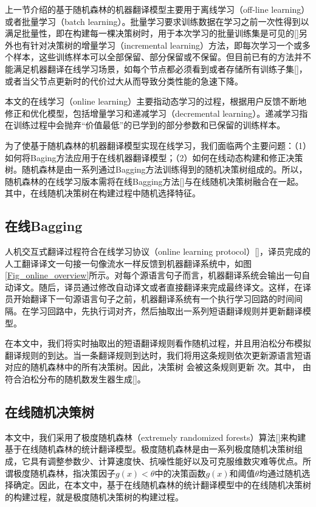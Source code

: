 上一节介绍的基于随机森林的机器翻译模型主要用于离线学习（off-line learning）或者批量学习（batch learning）。批量学习要求训练数据在学习之前一次性得到以满足批量性，即在构建每一棵决策树时，用于本次学习的批量训练集是可见的[\cite{LiLijia:2010}]另外也有针对决策树的增量学习（incremental learning）方法，即每次学习一个或多个样本，这些训练样本可以全部保留、部分保留或不保留。但目前已有的方法并不能满足机器翻译在线学习场景，如每个节点都必须看到或者存储所有训练子集[\cite{Utgoff:1997}]，或者当父节点更新时的代价过大从而导致分类性能的急速下降。

本文的在线学习（online learning）主要指动态学习的过程，根据用户反馈不断地修正和优化模型，包括增量学习和递减学习（decremental learning）。递减学习指在训练过程中会抛弃“价值最低”的已学到的部分参数和已保留的训练样本。

为了使基于随机森林的机器翻译模型实现在线学习，我们面临两个主要问题：（1）如何将Baging方法应用于在线机器翻译模型；（2）如何在线动态构建和修正决策树。随机森林是由一系列通过Bagging方法训练得到的随机决策树组成的。所以，随机森林的在线学习版本需将在线Bagging方法[\cite{Oza:2005}]与在线随机决策树融合在一起。其中，在线随机决策树在构建过程中随机选择特征。

\subsection{在线Bagging}

人机交互式翻译过程符合在线学习协议（online learning protocol）[\cite{Cesa-Bianchi:2006}]，译员完成的人工翻译译文一句接一句像流水一样反馈到机器翻译系统中，如图\ref{Fig_online_overview}所示。对每个源语言句子而言，机器翻译系统会输出一句自动译文。随后，译员通过修改自动译文或者直接翻译来完成最终译文。这样，在译员开始翻译下一句源语言句子之前，机器翻译系统有一个执行学习回路的时间间隔。在学习回路中，先执行词对齐，然后抽取出一系列短语翻译规则并更新翻译模型。

在本文中，我们将实时抽取出的短语翻译规则看作随机过程，并且用泊松分布模拟翻译规则的到达。当一条翻译规则到达时，我们将用这条规则依次更新源语言短语对应的随机森林中的所有决策树。因此，决策树 会被这条规则更新 次。其中， 由符合泊松分布的随机数发生器生成[\cite{Oza:2005}]。

\subsection{在线随机决策树}

本文中，我们采用了极度随机森林（extremely randomized forests）算法[\cite{Geurts:2006}]来构建基于在线随机森林的统计翻译模型。极度随机森林是由一系列极度随机决策树组成，它具有调整参数少、计算速度快、抗噪性能好以及可克服维数灾难等优点。所谓极度随机森林，指决策因子$g(x) < \theta$中的决策函数$g(x)$和阈值$\theta$均通过随机选择确定。因此，在本文中，基于在线随机森林的统计翻译模型中的在线随机决策树的构建过程，就是极度随机决策树的构建过程。

